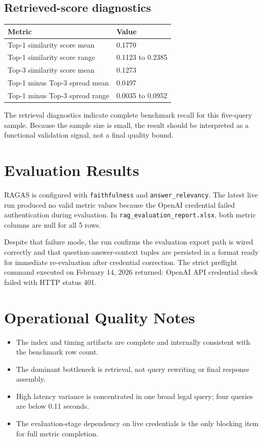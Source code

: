 \documentclass[12pt,a4paper]{article}
\begin{document}
\subsection*{Retrieved-score diagnostics}
\begin{longtable}{@{}p{} p{}@{}}
\toprule
Metric & Value \\
\midrule
Top-1 similarity score mean & 0.1770 \\
Top-1 similarity score range & 0.1123 to 0.2385 \\
Top-3 similarity score mean & 0.1273 \\
Top-1 minus Top-3 spread mean & 0.0497 \\
Top-1 minus Top-3 spread range & 0.0035 to 0.0952 \\
\bottomrule
\end{longtable}

The retrieval diagnostics indicate complete benchmark recall for this five-query sample. Because the sample size is small, the result should be interpreted as a functional validation signal, not a final quality bound.

\section{Evaluation Results}
RAGAS is configured with \texttt{faithfulness} and \texttt{answer\_relevancy}. The latest live run produced no valid metric values because the OpenAI credential failed authentication during evaluation. In \texttt{rag\_evaluation\_report.xlsx}, both metric columns are null for all 5 rows.

Despite that failure mode, the run confirms the evaluation export path is wired correctly and that question-answer-context tuples are persisted in a format ready for immediate re-evaluation after credential correction.
The strict preflight command executed on February 14, 2026 returned: OpenAI API credential check failed with HTTP status 401.

\section{Operational Quality Notes}
\begin{itemize}
\item The index and timing artifacts are complete and internally consistent with the benchmark row count.
\item The dominant bottleneck is retrieval, not query rewriting or final response assembly.
\item High latency variance is concentrated in one broad legal query; four queries are below 0.11 seconds.
\item The evaluation-stage dependency on live credentials is the only blocking item for full metric completion.
\end{itemize}
\end{document}
